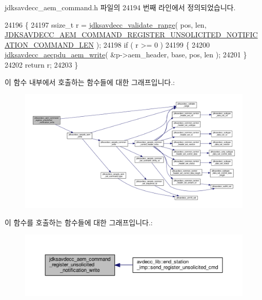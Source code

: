 jdksavdecc\+\_\+aem\+\_\+command.\+h 파일의 24194 번째 라인에서 정의되었습니다.


\begin{DoxyCode}
24196 \{
24197     ssize\_t r = \hyperlink{group__util_ga9c02bdfe76c69163647c3196db7a73a1}{jdksavdecc\_validate\_range}( pos, len, 
      \hyperlink{group__command__register__unsolicited__notification_ga6438f824be9cf76e1038ed8b5bc14bf9}{JDKSAVDECC\_AEM\_COMMAND\_REGISTER\_UNSOLICITED\_NOTIFICATION\_COMMAND\_LEN}
       );
24198     \textcolor{keywordflow}{if} ( r >= 0 )
24199     \{
24200         \hyperlink{group__aecpdu__aem_gad658e55771cce77cecf7aae91e1dcbc5}{jdksavdecc\_aecpdu\_aem\_write}( &p->aem\_header, base, pos, len );
24201     \}
24202     \textcolor{keywordflow}{return} r;
24203 \}
\end{DoxyCode}


이 함수 내부에서 호출하는 함수들에 대한 그래프입니다.\+:
\nopagebreak
\begin{figure}[H]
\begin{center}
\leavevmode
\includegraphics[width=350pt]{group__command__register__unsolicited__notification_ga29ce701c6875bebea0eba0cd03684c51_cgraph}
\end{center}
\end{figure}




이 함수를 호출하는 함수들에 대한 그래프입니다.\+:
\nopagebreak
\begin{figure}[H]
\begin{center}
\leavevmode
\includegraphics[width=350pt]{group__command__register__unsolicited__notification_ga29ce701c6875bebea0eba0cd03684c51_icgraph}
\end{center}
\end{figure}


